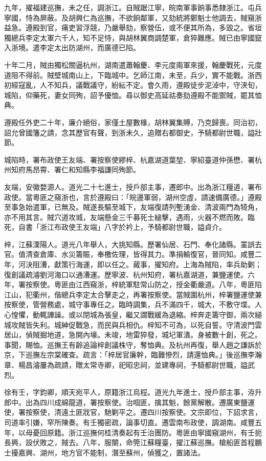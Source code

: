 \begin{pinyinscope}
九年，擢福建巡撫，未之任，調浙江。自賊踞江寧，皖南軍事餉事悉隸浙江。屯兵寧國，恃為屏蔽。及胡興仁為巡撫，不欲餉鄰軍，又劾統將鄭魁士他調去，賊窺浙益急。遵殿到官，痛吏習浮競，乃嚴舉劾，察營伍，或不便其所為，多毀之。省垣獨總兵李定太軍六千人，知不足恃，與胡林翼商調楚軍，倉猝難應。賊已由寧國竄入浙境。遣李定太出防湖州，而廣德已陷。

十年二月，賊由獨松關逼杭州，湖南遣蕭翰慶、李元度兩軍來援，翰慶戰死，元度道阻不得前。賊壁城南山上，下臨城中。乞師江南，未至，兵少，實不能戰。浙西初經寇亂，人不知兵，議戰議守，紛紜不定。會久雨，遵殿徒步泥淖中，守浹旬，城陷，仰藥死，妻女同殉，詔予優恤。尋以御史高延祜奏劾遵殿不能禦賊，罷其恤典。

遵殿任外吏二十年，廉介絕俗，家僅土屋數椽，胡林翼集賻，乃克歸喪。同治初，詔允曾國籓之請，念其歷官有聲，到浙未久，追贈右都御史，予騎都尉世職，謚壯節。

城陷時，署布政使王友端、署按察使繆梓、杭嘉湖道葉堃、寧紹臺道仲孫懋、署杭州知府馬昂霄、署仁和知縣李福謙同殉節。

友端，安徽婺源人。道光二十七進士，授戶部主事，遷郎中。出為浙江糧道，署布政使。當粵匪之窺浙也，言於遵殿曰：「皖邊軍弱，湖州空虛，請速備廣德。」遵殿至事急始遣軍，已無及。賊遂長驅至城下，友端復請列塹湧金、清波兩門為犄角，亦不用其言。賊穴道攻城，友端懸金三千募死士縋擊，遇雨，火器不燃而敗。臨死，自書「浙江布政使王友端」八字於衿上，予騎都尉世職，謚貞介。

梓，江蘇溧陽人。道光八年舉人，大挑知縣。歷署仙居、石門、奉化諸縣。罣誤去官。值清查倉庫、水災籌賑，奉檄佐理，皆得其力。準捐輸復官，晉同知。咸豐二年，河決阻漕，獻策行海運，即以任之。蕆事，擢知府。上海為賊陷，率兵助剿；復創議疏濬劉河海口以通漕運。歷寧波、杭州知府，署杭嘉湖道，兼鹽運使。六年，署按察使。粵匪由江西窺浙，梓統軍駐常山防之，授金衢嚴道。八年，粵匪陷江山，犯衢州，偕總兵李定太合擊走之，再署按察使。當賊圍杭州，梓署鹽運使兼按察使，管營務處，城守事專任之。臨時調集，兵不滿四千，城大，不敷守堞。人心惶懼，動輒譁譟。或以閉城為張皇，繼又謂戰緩為退縮。梓奔走籌守御，兩次縋城攻賊皆失利。城紳促戰急，而民與兵相仇。梓知不可為，以死自誓。守清波門雲居山，偵賊掘地道，急開內壕。未竣，地雷猝發，城圮軍潰。身被數十創，死之。事聞，賜恤。巡撫王有齡追論梓創議株守，奪恤典。及杭州再復，舉人趙之謙訴於京，下巡撫左宗棠確查。疏言：「梓居官廉幹，臨難慘烈，請還恤典。」後巡撫李瀚章、楊昌濬屢為疏請，贈太常寺卿，祀昭忠祠，並建專祠，予騎都尉世職，謚武烈。

徐有壬，字鈞卿，順天宛平人，原籍浙江烏程。道光九年進士，授戶部主事，洊升郎中。出為四川成綿龍道，署按察使。治啯匪，擒其魁，餘黨解散。遷廣東鹽運使，署按察使，清遠土匪戕官，馳剿平之。遷四川按察使。文宗即位，下詔求言，司道率引嫌，罕所陳奏。有壬獨密疏，論事切直。遷雲南布政使，調湖南。咸豐五年，以母憂回原籍。浙江巡撫何桂清奏起有壬治團防。粵匪由寧國窺湖州，有壬扼長興，設伏敗之，賊去。八年，服闋，命筦江蘇糧臺，擢江蘇巡撫。槍船匪首程鵬士擾嘉興、湖州，地方官不能制，潛至蘇州，偵獲之，置諸法。


\end{pinyinscope}
